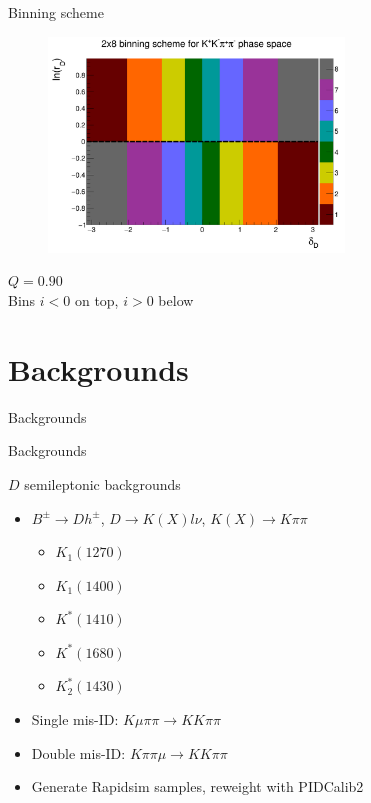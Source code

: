 \documentclass{beamer}
\begin{document}
\begin{frame}{Binning scheme}
  \begin{figure}
    \centering
    \includegraphics[width = 0.7\textwidth]{Plots/BinningSchemePlot_8Bins.png}
  \end{figure}
  \vspace{-1.0cm}
  \begin{center}
    $Q = 0.90$ \\
    Bins $i < 0$ on top, $i > 0$ below
  \end{center}
\end{frame}

\section{Backgrounds}
\begin{frame}{Backgrounds}
  \begin{center}
    {\huge Backgrounds}
  \end{center}
\end{frame}

\begin{frame}{$D$ semileptonic backgrounds}
  \begin{itemize}
    \setlength\itemsep{1em}
    \item{$B^\pm\to Dh^\pm$, $D\to K(X)l\nu$, $K(X)\to K\pi\pi$}
    \begin{itemize}
      \item{$K_1(1270)$}
      \item{$K_1(1400)$}
      \item{$K^*(1410)$}
      \item{$K^*(1680)$}
      \item{$K_2^*(1430)$}
    \end{itemize}
    \item{Single mis-ID: $K\mu\pi\pi\to KK\pi\pi$}
    \item{Double mis-ID: $K\pi\pi\mu\to KK\pi\pi$}
    \item{Generate Rapidsim samples, reweight with PIDCalib2}
  \end{itemize}
\end{frame}
\end{document}
